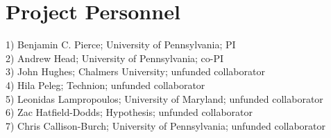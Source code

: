 \section*{Project Personnel}

1) Benjamin C. Pierce; University of Pennsylvania; PI \\
2) Andrew Head; University of Pennsylvania; co-PI \\
3) John Hughes; Chalmers University; unfunded collaborator \\
4) Hila Peleg; Technion; unfunded collaborator \\
5) Leonidas Lampropoulos; University of Maryland; unfunded collaborator \\
6) Zac Hatfield-Dodds; Hypothesis; unfunded collaborator \\
7) Chris Callison-Burch; University of Pennsylvania; unfunded collaborator
